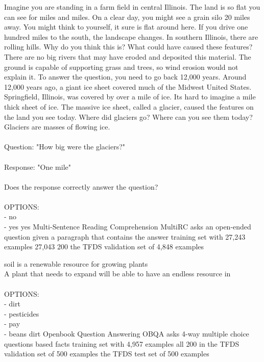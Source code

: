 \taskio
{Imagine you are standing in a farm field in central Illinois. The land is so flat you can see for miles and miles. On a clear day, you might see a grain silo 20 miles away. You might think to yourself, it sure is flat around here. If you drive one hundred miles to the south, the landscape changes. In southern Illinois, there are rolling hills. Why do you think this is? What could have caused these features? There are no big rivers that may have eroded and deposited this material. The ground is capable of supporting grass and trees, so wind erosion would not explain it. To answer the question, you need to go back 12,000 years. Around 12,000 years ago, a giant ice sheet covered much of the Midwest United States. Springfield, Illinois, was covered by over a mile of ice. Its hard to imagine a mile thick sheet of ice. The massive ice sheet, called a glacier, caused the features on the land you see today. Where did glaciers go? Where can you see them today? Glaciers are masses of flowing ice. \\\\Question: "How big were the glaciers?"\\\\Response: "One mile"\\\\Does the response correctly answer the question?\\\\OPTIONS:\\- no\\- yes}
{yes}
{
    \taskdescription
    {Multi-Sentence Reading Comprehension} %
    {MultiRC} %
    {\cite{khashabi-etal-2018-looking}} %
    {asks an open-ended question given a paragraph that contains the answer} %
    {training set with 27,243 examples} %
    {27,043} %
    {200} %
    {the TFDS validation set of 4,848 examples} %
}

\taskio
{soil is a renewable resource for growing plants\\A plant that needs to expand will be able to have an endless resource in\\\\OPTIONS:\\- dirt\\- pesticides\\- pay\\- beans}
{dirt}
{
    \taskdescription
    {Openbook Question Answering} %
    {OBQA} %
    {\citep{mihaylov-etal-2018-suit}} %
    {asks 4-way multiple choice questions based facts} %
    {training set with 4,957 examples} %
    {all} %
    {200 in the TFDS validation set of 500 examples} %
    {the TFDS test set of 500 examples} %
}


